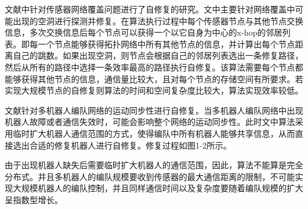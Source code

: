 文献\parencite{Auto-holeDetection}中针对传感器网络覆盖问题进行了自修复的研究。文中主要针对网络覆盖中可能出现的空洞进行探测并修复。在算法执行过程中每个传感器节点与其他节点交换信息，多次交换信息后每个节点可以获得一个以它自身为中心的x-hop的邻居列表。即每一个节点能够获得拓扑网络中所有其他节点的信息，并计算出每个节点距离自己的跳数。如果出现空洞，则节点会根据自己的邻居列表选出一条修复路径，然后从所有的路径中选择一条效率最高的路径执行自修复。该算法需要每个节点都能够获得其他节点的信息，通信量比较大，且对每个节点的存储空间有所要求。若实现大规模节点的自修复则算法的时间和空间复杂度比较大，算法实现效率较低。

文献\parencite{Zhang2006Motion}针对多机器人编队网络的运动同步性进行自修复。当多机器人编队网络中出现机器人故障或者通信失效时，可能会影响整个网络的运动同步性。此时文中算法采用临时扩大机器人通信范围的方式，使得编队中所有机器人能够共享信息，从而直接选出合适的修复机器人进行自修复。修复过程如图1-2所示。
\begin{figure*}[!htbp]
	\begin{multicols}{2}
		\begin{center}
		\end{center}
		\begin{center}
		\end{center}
		\begin{center}
		\end{center}
		\begin{center}
		\end{center}
	\end{multicols}
\end{figure*}
由于出现机器人缺失后需要临时扩大机器人的通信范围，因此，算法不能算是完全分布式。并且多机器人的编队规模要收到传感器的最大通信距离的限制，不可能实现大规模机器人的编队控制，并且同样通信时间以及复杂度要随着编队规模的扩大呈指数型增长。

